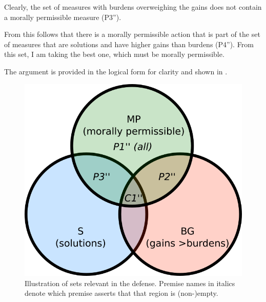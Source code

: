 Clearly, the set of measures with burdens overweighing the gains does not contain a morally permissible measure (P3'').

From this follows that there is a morally permissible action that is part of the set of measures that are solutions and have higher gains than burdens (P4'').
From this set, I am taking the best one, which must be morally permissible.

\begin{argument}

\end{argument}

The argument is provided in the logical form for clarity and
shown in .

\begin{figure}[h!]
\center
\includegraphics[width=0.45\linewidth]{img/venn.png}
\caption{Illustration of sets relevant in the defense. Premise names in italics denote which premise asserts that that region is (non-)empty.}
\label{fig:venn}
\end{figure}


